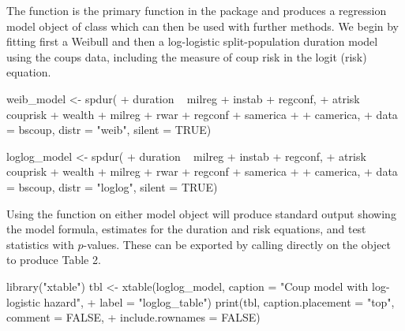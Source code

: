 The  function is the primary function in the package and
produces a regression model object of class  which can then
be used with further methods. We begin by fitting first a Weibull and
then a log-logistic split-population duration model using the coups
data, including the measure of coup risk in the logit (risk) equation.

\begin{example}
  weib_model <- spdur(
  +    duration ~ milreg + instab + regconf,
  +    atrisk ~ couprisk + wealth + milreg + rwar + regconf + samerica + 
  +      camerica,
  +    data = bscoup, distr = "weib", silent = TRUE)

  loglog_model <- spdur(
  +    duration ~ milreg + instab + regconf,
  +    atrisk ~ couprisk + wealth + milreg + rwar + regconf + samerica + 
  +      camerica,
  +    data = bscoup, distr = "loglog", silent = TRUE)
\end{example}

Using the  function on either model object will produce
standard output showing the model formula, estimates for the duration
and risk equations, and test statistics with \(p\)-values. These can be
exported by calling \citep[see][]{dahl2016xtable} directly on the  object to
produce Table 2.

\begin{example}
  library("xtable")
  tbl <- xtable(loglog_model, caption = "Coup model with log-logistic hazard",
  +    label = "loglog_table")
  print(tbl, caption.placement = "top", comment = FALSE, 
  +    include.rownames = FALSE)
\end{example}

